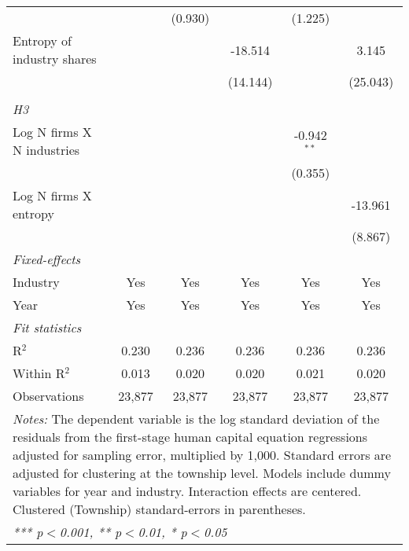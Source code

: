 \begin{tabular}{lccccc}
                                        &                 & (0.930)         &                 & (1.225)         &   \\   
   Entropy of industry shares           &                 &                 & -18.514         &                 & 3.145\\   
                                        &                 &                 & (14.144)        &                 & (25.043)\\   
\hdashline %
\\[0.1ex] %
\emph{H3} \\ 
   Log N firms X N industries           &                 &                 &                 & -0.942$^{**}$   &   \\   
                                        &                 &                 &                 & (0.355)         &   \\   
   Log N firms X entropy                &                 &                 &                 &                 & -13.961\\   
                                        &                 &                 &                 &                 & (8.867)\\   
   \midrule
   \emph{Fixed-effects}\\
   Industry                             & Yes             & Yes             & Yes             & Yes             & Yes\\  
   Year                                 & Yes             & Yes             & Yes             & Yes             & Yes\\  
   \midrule
   \emph{Fit statistics}\\
   R$^2$                                & 0.230           & 0.236           & 0.236           & 0.236           & 0.236\\  
   Within R$^2$                         & 0.013           & 0.020           & 0.020           & 0.021           & 0.020\\  
   Observations                         & 23,877          & 23,877          & 23,877          & 23,877          & 23,877\\  
   \midrule \midrule
\multicolumn{6}{p{16cm}}{\emph{Notes:} The dependent variable is the log 
    standard deviation of the residuals from the first-stage human capital equation 
    regressions adjusted for sampling error, multiplied by 1,000. Standard errors 
    are adjusted for clustering at the township level. Models include dummy variables 
    for year and industry. Interaction effects are centered. Clustered (Township) 
    standard-errors in parentheses.}\\
\multicolumn{6}{l}{\emph{*** p$<$0.001, ** p$<$0.01, * p$<$0.05}} \\ 
\end{tabular}
\par\endgroup
